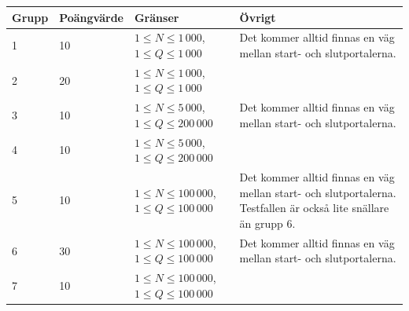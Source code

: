 \begin{tabular}{| l | l | l | l |}
\hline
Grupp & Poängvärde & Gränser & Övrigt\\ \hline
1     & 10         & $ 1 \le N \le 1\,000$,$1 \le Q \le 1\,000$ & Det kommer alltid finnas en väg mellan start- och slutportalerna.\\ \hline
2     & 20         & $ 1 \le N \le 1\,000$,$1 \le Q \le 1\,000$ &  \\ \hline
3     & 10         & $ 1 \le N \le 5\,000$,$1 \le Q \le 200\,000$ & Det kommer alltid finnas en väg mellan start- och slutportalerna.\\ \hline
4     & 10         & $ 1 \le N \le 5\,000$,$1 \le Q \le 200\,000$ &  \\ \hline
5     & 10         & $ 1 \le N \le 100\,000$,$1 \le Q \le 100\,000$ & Det kommer alltid finnas en väg mellan start- och slutportalerna. Testfallen är också lite snällare än grupp 6.\\ \hline
6     & 30         & $ 1 \le N \le 100\,000$,$1 \le Q \le 100\,000$ & Det kommer alltid finnas en väg mellan start- och slutportalerna. \\ \hline
7     & 10         & $ 1 \le N \le 100\,000$,$1 \le Q \le 100\,000$ &  \\ \hline
\end{tabular}

